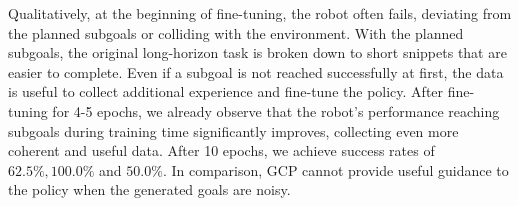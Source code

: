 Qualitatively, at the beginning of fine-tuning, the robot often fails, deviating from the planned subgoals or colliding with the environment.
With the planned subgoals, the original long-horizon task is broken down to short snippets that are easier to complete.
Even if a subgoal is not reached successfully at first, the data is useful to collect additional experience and fine-tune the policy.
After fine-tuning for 4-5 epochs, we already observe that the robot's performance reaching subgoals during training time significantly improves, collecting even more coherent and useful data.
After 10 epochs, we achieve success rates of $62.5\%, 100.0\%$ and $50.0\%$.
In comparison, GCP cannot provide useful guidance to the policy when the generated goals are noisy.


